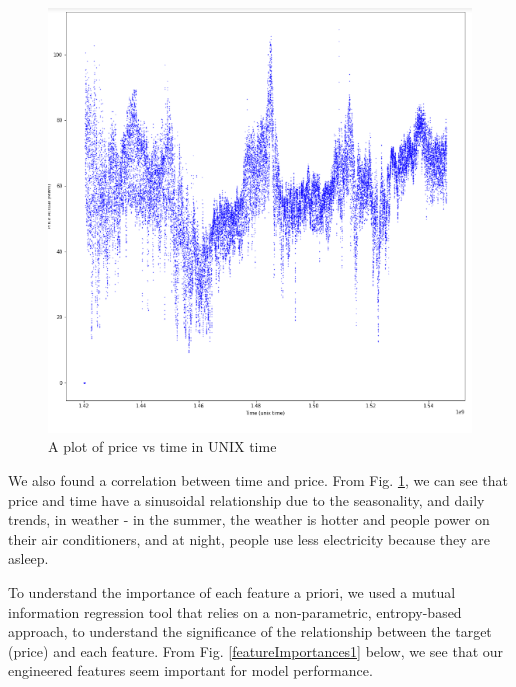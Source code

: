 \documentclass[10pt]{article}
\begin{document}
\begin{figure}[ht]
    \centering
    \includegraphics[scale=0.68]{graph2.png}
    \caption{A plot of price vs time in UNIX time}
    \label{priceVsTemp}
\end{figure}

We also found a correlation between time and price. From Fig. \ref{priceVsTemp}, we can see that price and time have a sinusoidal relationship due to the seasonality, and daily trends, in weather - in the summer, the weather is hotter and people power on their air conditioners, and at night, people use less electricity because they are asleep. 

To understand the importance of each feature a priori, we used a mutual information regression tool that relies on a non-parametric, entropy-based approach, to understand the significance of the relationship between the target (price) and each feature.  From Fig. \ref{featureImportances1} below, we see that our engineered features seem important for model performance.
\end{document}
